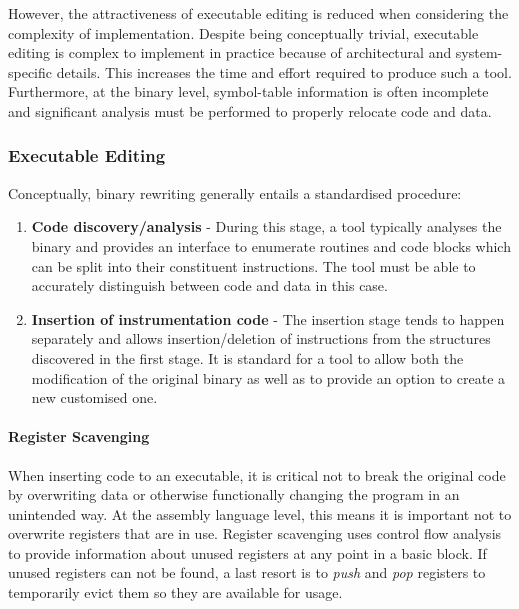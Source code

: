 However, the attractiveness of executable editing is reduced when considering the complexity of implementation. Despite being conceptually trivial, executable editing is complex to implement in practice because of architectural and system-specific details. This increases the time and effort required to produce such a tool. Furthermore, at the binary level, symbol-table information is often incomplete and significant analysis must be performed to properly relocate code and data\cite{rewriting_executable_files}.

\subsubsection{Executable Editing}

Conceptually, binary rewriting generally entails a standardised procedure:

\begin{enumerate}
 \item \textbf{Code discovery/analysis} - During this stage, a tool typically analyses the binary and provides an interface to enumerate routines and code blocks which can be split into their constituent instructions. The tool must be able to accurately distinguish between code and data in this case.
\item \textbf{Insertion of instrumentation code} - The insertion stage tends to happen separately and allows insertion/deletion of instructions from the structures discovered in the first stage. It is standard for a tool to allow both the modification of the original binary as well as to provide an option to create a new customised one.
\end{enumerate}

\paragraph{Register Scavenging}

When inserting code to an executable, it is critical not to break the original code by overwriting data or otherwise functionally changing the program in an unintended way. At the assembly language level, this means it is important not to overwrite registers that are in use. Register scavenging uses control flow analysis to provide information about unused registers at any point in a basic block\cite{qpt}. If unused registers can not be found, a last resort is to \emph{push} and \emph{pop} registers to temporarily evict them so they are available for usage.

